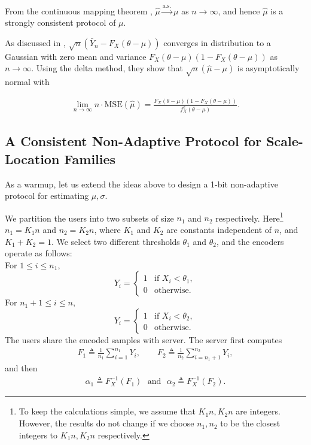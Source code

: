 \documentclass[10pt]{article} %
\theoremstyle{plain}
\theoremstyle{definition}
\theoremstyle{remark}
\newcommand{\as}{\text{a.s.}}
\newcommand{\mse}{\mathrm{MSE}}
\begin{document}
From the continuous mapping theorem \citep{casella2002statistical},  \(\hat{\mu} \xrightarrow{\as} \mu\) as \(n \rightarrow \infty\), and hence \(\hat{\mu}\) is a strongly consistent protocol of \(\mu\).
\par As discussed in \citep{kipnis2022mean}, $\sqrt{n}(\bar{Y}_n-F_X(\theta-\mu ))$ converges in distribution to a Gaussian with zero mean and variance $F_X(\theta-\mu)(1-F_X(\theta-\mu))$ as $n\to\infty$. Using the delta method, they show that $\sqrt{n}(\hat{\mu}-\mu)$ is asymptotically normal with 

\begin{align*}
 \lim_{n\to\infty}n \cdot \mse(\hat{\mu})=   \frac{F_X\left( \theta - \mu \right)\left( 1 - F_X\left( \theta - \mu \right)\right) }{f_X^{2}(\theta - \mu)}.
\end{align*}

\subsection{A Consistent Non-Adaptive Protocol for Scale-Location Families}\label{subsec:nonadaptivescheme}
As a warmup, let us extend the ideas above to design a 1-bit non-adaptive protocol for estimating $\mu,\sigma$.
\par  We partition the users into two subsets of size $n_1$ and $n_2$ respectively. 
Here\footnote{To keep the calculations simple, we assume that $K_1n,K_2n$ are integers. However, the results do not change if we choose $n_1,n_2$ to be the closest integers to $K_1n,K_2n$ respectively.} \( n_1 = K_1 n \) and \( n_2 = K_2 n \), where \( K_1 \) and \( K_2 \) are constants independent of \( n \), and \( K_1 + K_2  =1 \).  We select two different thresholds $\theta_1$ and $\theta_2$, and the encoders operate as follows: \\ 
For \( 1 \leq i \leq n_1 \),
\[ Y_i = 
\begin{cases} 
1 & \text{if } X_i < \theta_1, \\
0 & \text{otherwise}.
\end{cases} 
\]
For \( n_1 +1 \leq i \leq n \), 
\[
 Y_i = 
\begin{cases} 
1 & \text{if } X_i < \theta_2, \\
0 & \text{otherwise}.
\end{cases}
\]  
 The users share the encoded samples with server. The server first computes 
\begin{align*}
    F_1 \triangleq  \frac{1}{n_1} \sum_{i=1}^{n_1}  Y_{i},  \qquad  F_2 \triangleq \frac{1}{n_2} \sum_{i=n_1 +1}^{n_2}  Y_{i}, 
\end{align*}
and then
\begin{align}\label{eq:alpha1alpha2}
    \alpha_1  \triangleq F_{X}^{-1}(F_1)  \hspace{8pt} \text{and} \hspace{8pt} \alpha_2  \triangleq F_{X}^{-1}(F_2). 
\end{align}
\end{document}
